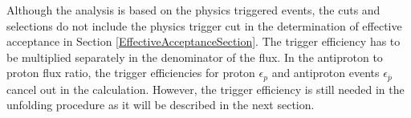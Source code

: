 \begin{comment}
Low and intermediate:
用的是真实的TriggerEfficiency， 该TriggerEfficiency通过“TriggerEfficiency”程序来计算得到。
    //// Load TriggerEfficiency //FIX ME: Load proton TriggerEff
    TFile *f5 = new TFile( (lowpath + string("/TriggerEff_B1042_antipr.pl1.1800_7.6_all.root")).c_str() );
    TFile *f6 = new TFile( (lowpath + string("/TriggerEff_B1042_antipr.pl1.1800_7.6_all.root")).c_str() );
    TH1F *Trig_antiproton_noprescaling_all = (TH1F*)f5->Get("TriggerEff_noprescaling");
    TH1F *Trig_proton_noprescaling_all       = (TH1F*)f6->Get("TriggerEff_noprescaling");
    TH1D *Trig_antiproton_noprescaling      = new TH1D("", "", 20, subrange_intermediate.data());
    TH1D *Trig_proton_noprescaling            = new TH1D("", "", 20, subrange_intermediate.data());
    
High:
用的是空的histogarm
实际“TriggerEfficiency”可以从Auxiliary中计算各种：通过“TriggerEfficiency”程序。
        PhysicsTriggerHisto->Write("PhysicsTriggerHisto");
        effMC_Preselection->Write("effMC_Preselection");
        effData_Preselection->Write("effData_Preselection");
        effMC_QualityCuts->Write("effMC_QualityCuts");
        effData_QualityCuts->Write("effData_QualityCuts");
        TriggerEff.Write("TriggerEff");
        TriggerEff_noprescaling.Write("TriggerEff_noprescaling");
       
\end{comment}

Although the analysis is based on the physics triggered events, the cuts and selections do not include the physics trigger cut in the determination of effective acceptance in Section \ref{EffectiveAcceptanceSection}. The trigger efficiency has to be multiplied separately in the denominator of the flux. In the antiproton to proton flux ratio, the trigger efficiencies for proton $\epsilon_{p}$ and antiproton events $\epsilon_{ \overline{p} }$ cancel out in the calculation. However, the trigger efficiency is still needed in the unfolding procedure as it will be described in the next section.













